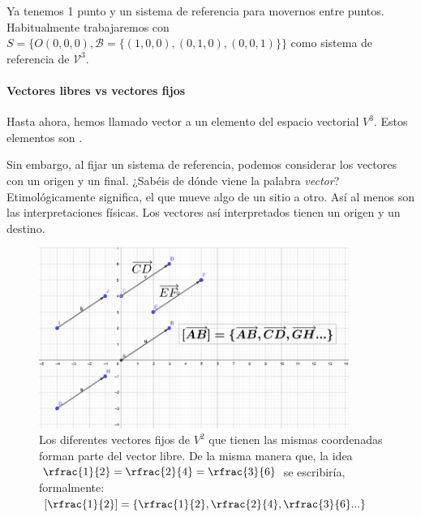 \obs Ya tenemos 1 punto y un sistema de referencia para movernos entre puntos. 
%
Habitualmente trabajaremos con $S= \{O(0,0,0), \mathcal{B} = \{(1,0,0), (0,1,0), (0,0,1)\}\}$ como sistema de referencia de $\mathcal{V}^3$.



\paragraph{Vectores libres vs vectores fijos}


Hasta ahora, hemos llamado vector a un elemento del espacio vectorial $V^3$. 
%
Estos elementos son .

Sin embargo, al fijar un sistema de referencia, podemos considerar los vectores con un origen y un final. 
%
¿Sabéis de dónde viene la palabra \textit{vector}? 
%
Etimológicamente significa, el que mueve algo de un sitio a otro. 
%
Así al menos son las interpretaciones físicas. 
%
Los vectores así interpretados tienen un origen y un destino.

\begin{figure}[hptb]
    \centering
    \includegraphics[width=0.9\textwidth]{img/Fijos-libres.png}
    \caption{Los diferentes vectores fijos de $V^2$ que tienen las mismas coordenadas forman parte del vector libre. 
    \newline
    De la misma manera que, la idea $\rfrac{1}{2}=\rfrac{2}{4}=\rfrac{3}{6}$ se escribiría, formalmente: $\left[\rfrac{1}{2}\right] = \left\{\rfrac{1}{2},\rfrac{2}{4},\rfrac{3}{6} ... \right\}$}
    \label{fig:plano}
\end{figure}


